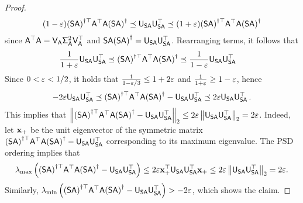 \begin{proof}
\begin{align*}
 (1  - \eps) \tpinv{(\matS\matA)} \matA^\top \matA  \pinv{(\matS\matA )}
  \preceq  \matU_{\matS \matA} \matU_{\matS \matA}^\top  \preceq  (1+\eps) \tpinv{(\matS\matA)} \matA^\top \matA  \pinv{(\matS\matA )}
\end{align*}
since $\matA^\top \matA = \matV_{\matA} \matSig^2_{\matA} \matV_{\matA}^\top $ and $\matS\matA \pinv{(\matS\matA)} = \matU_{\matS\matA} \matU_{\matS\matA}^\top$.
Rearranging terms, it follows that
\begin{align*}
	\frac1{1+\eps} \matU_{\matS \matA} \matU_{\matS \matA}^\top  & \preceq  \tpinv{(\matS\matA)} \matA^\top \matA  \pinv{(\matS\matA )}
	 \preceq  \frac1{1-\eps} \matU_{\matS \matA} \matU_{\matS \matA}^\top
\end{align*}
Since $0 < \eps < 1/2$, it holds that $\frac1{1-\eps/3}  \leq 1 + 2\eps$ and $\frac1{1+\eps} \geq 1 - \eps$, hence
\begin{align*}
-2\eps \matU_{\matS \matA} \matU_{\matS \matA}^\top
\preceq  \tpinv{(\matS\matA)} \matA^\top \matA  \pinv{(\matS\matA )} - \matU_{\matS \matA} \matU_{\matS \matA}^\top
 \preceq  2\eps \matU_{\matS \matA} \matU_{\matS \matA}^\top\,.
\end{align*}
This implies that $\norm{\tpinv{(\matS\matA)} \matA^\top \matA  \pinv{(\matS\matA )}  -  \matU_{\matS \matA} \matU_{\matS \matA}^\top}
  \leq  2\eps \norm{ \matU_{\matS \matA} \matU_{\matS \matA}^\top } = 2\eps$. Indeed, let $\x_+$ be the unit eigenvector of the symmetric matrix  $\tpinv{(\matS\matA)} \matA^\top \matA  \pinv{(\matS\matA )} - \matU_{\matS \matA} \matU_{\matS \matA}^\top$ corresponding to its maximum eigenvalue. The PSD ordering implies that
\begin{align*}
\lambda_{\max}\left( \tpinv{(\matS\matA)} \matA^\top \matA  \pinv{(\matS\matA )} - \matU_{\matS \matA} \matU_{\matS \matA}^\top \right)
\leq  2 \eps \x_+^\top \matU_{\matS \matA} \matU_{\matS \matA}^\top \x_+ \leq 2\eps \norm{\matU_{\matS \matA} \matU_{\matS \matA}^\top}= 2\eps.
\end{align*}
Similarly,
$\lambda_{\min}\left( \tpinv{(\matS\matA)} \matA^\top \matA  \pinv{(\matS\matA )} - \matU_{\matS \matA} \matU_{\matS \matA}^\top \right)> - 2\eps$, which shows the claim.
\end{proof}

